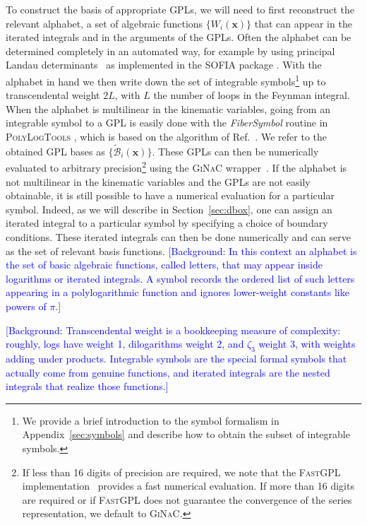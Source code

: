 \documentclass[a4paper,11pt]{article}
\begin{document}
To construct the basis of appropriate GPLs, we will need to first reconstruct the relevant alphabet, a set of algebraic functions $\{W_i(\mathbf{x})\}$ that can appear in the iterated integrals and in the arguments of the GPLs.  Often the alphabet can be determined completely in an automated way, for example by using principal Landau determinants~\cite{Fevola:2023fzn} as implemented in the \textsc{SOFIA} package \cite{Correia:2025yao}. With the alphabet in hand we then write down the set of integrable symbols\footnote{We provide a brief introduction to the symbol formalism in Appendix~\ref{sec:symbols} and describe how to obtain the subset of integrable symbols.} up to transcendental weight $2 L$, with $L$ the number of loops in the Feynman integral. When the alphabet is multilinear in the kinematic variables, going from an integrable symbol to a GPL is easily done with the \textit{FiberSymbol} routine in \textsc{PolyLogTools} \cite{Duhr:2019tlz}, which is based on the algorithm of Ref.~\cite{Anastasiou:2013srw}. We refer to the obtained GPL bases as $\{\tilde{\mathcal{B}}_i(\mathbf{x})\}$. These GPLs can then be numerically evaluated to arbitrary precision\footnote{If less than 16 digits of precision are required, we note that the \textsc{FastGPL} implementation~\cite{Wang:2021imw} provides a fast numerical evaluation. If more than 16 digits are required or if \textsc{FastGPL} does not guarantee the convergence of the series representation, we default to \textsc{GiNaC}.} using the \textsc{GiNaC} wrapper~\cite{Bauer:2002, Vollinga:2004sn}. If the alphabet is not multilinear in the kinematic variables and the GPLs are not easily obtainable, it is still possible to have a numerical evaluation for a particular symbol. Indeed, as we will describe in Section~\ref{sec:dbox}, one can assign an iterated integral to a particular symbol by specifying a choice of boundary conditions. These iterated integrals can then be done numerically and can serve as the set of relevant basis functions. 
\textcolor{blue}{\small [Background: In this context an alphabet is the set of basic algebraic functions, called letters, that may appear inside logarithms or iterated integrals. A symbol records the ordered list of such letters appearing in a polylogarithmic function and ignores lower-weight constants like powers of $\pi$.]}

\textcolor{blue}{\small [Background: Transcendental weight is a bookkeeping measure of complexity: roughly, logs have weight 1, dilogarithms weight 2, and $\zeta_3$ weight 3, with weights adding under products. Integrable symbols are the special formal symbols that actually come from genuine functions, and iterated integrals are the nested integrals that realize those functions.]}
\end{document}

